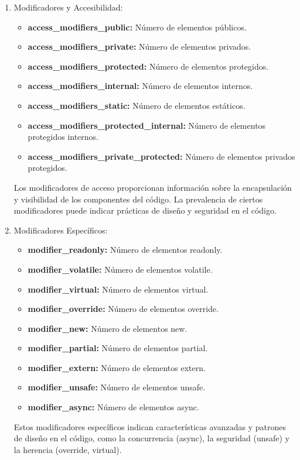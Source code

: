 \begin{enumerate}
    \item Modificadores y Accesibilidad:
    \begin{itemize}
        \item {\bf access\_modifiers\_public:} Número de elementos públicos.
        \item {\bf access\_modifiers\_private:} Número de elementos privados.
        \item {\bf access\_modifiers\_protected:} Número de elementos protegidos.
        \item {\bf access\_modifiers\_internal:} Número de elementos internos.
        \item {\bf access\_modifiers\_static:} Número de elementos estáticos.
        \item {\bf access\_modifiers\_protected\_internal:} Número de elementos protegidos internos.
        \item {\bf access\_modifiers\_private\_protected:} Número de elementos privados protegidos.
    \end{itemize}
    Los modificadores de acceso proporcionan información sobre la encapsulación y visibilidad de los componentes del código. La prevalencia de ciertos modificadores puede indicar prácticas de diseño y seguridad en el código.

    \item Modificadores Específicos:
    \begin{itemize}
        \item {\bf modifier\_readonly:} Número de elementos readonly.
        \item {\bf modifier\_volatile:} Número de elementos volatile.
        \item {\bf modifier\_virtual:} Número de elementos virtual.
        \item {\bf modifier\_override:} Número de elementos override.
        \item {\bf modifier\_new:} Número de elementos new.
        \item {\bf modifier\_partial:} Número de elementos partial.
        \item {\bf modifier\_extern:} Número de elementos extern.
        \item {\bf modifier\_unsafe:} Número de elementos unsafe.
        \item {\bf modifier\_async:} Número de elementos async.
    \end{itemize}
    Estos modificadores específicos indican características avanzadas y patrones de diseño en el código, como la concurrencia (async), la seguridad (unsafe) y la herencia (override, virtual).


\end{enumerate}
